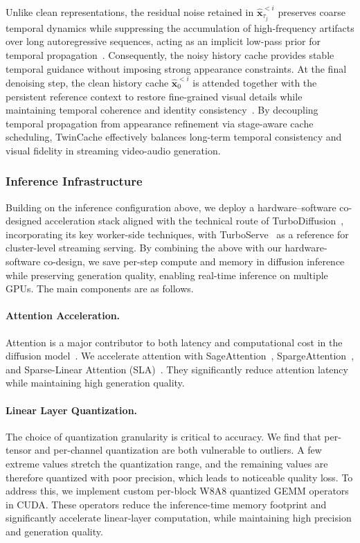 Unlike clean representations, the residual noise retained in $\hat{\bm{x}}_{\tau_j}^{<i}$ preserves coarse temporal dynamics while suppressing the accumulation of high-frequency artifacts over long autoregressive sequences, acting as an implicit low-pass prior for temporal propagation~\cite{huang2025live,zheng2026causal}. Consequently, the noisy history cache provides stable temporal guidance without imposing strong appearance constraints. At the final denoising step, the clean history cache $\hat{\bm{x}}_{0}^{<i}$ is attended together with the persistent reference context to restore fine-grained visual details while maintaining temporal coherence and identity consistency~\cite{zeng2026lpm}. By decoupling temporal propagation from appearance refinement via stage-aware cache scheduling, TwinCache effectively balances long-term temporal consistency and visual fidelity in streaming video-audio generation.


\subsubsection{Inference Infrastructure}

Building on the inference configuration above, we deploy a hardware--software co-designed acceleration stack aligned with the technical route of TurboDiffusion~\cite{zhang2025turbodiffusion}, incorporating its key worker-side techniques, with TurboServe~\cite{jiang2026turboserve} as a reference for cluster-level streaming serving. By combining the above with our hardware-software co-design, we save per-step compute and memory in diffusion inference while preserving generation quality, enabling real-time inference on multiple GPUs. The main components are as follows.

\paragraph{Attention Acceleration.}
Attention is a major contributor to both latency and computational cost in the diffusion model~\cite{zhangefficient}. We accelerate attention with SageAttention~\cite{zhang2025sageattention,zhang2024sageattention2,zhang2025sageattention2++,zhang2025sageattention3,zhang2026sagebwd}, SpargeAttention~\cite{zhang2025spargeattention,zhang2026spargeattention2}, and Sparse-Linear Attention (SLA)~\cite{zhang2025sla,zhang2026sla2}. They significantly reduce attention latency while maintaining high generation quality.

\paragraph{Linear Layer Quantization.}
The choice of quantization granularity is critical to accuracy. We find that per-tensor and per-channel quantization are both vulnerable to outliers. A few extreme values stretch the quantization range, and the remaining values are therefore quantized with poor precision, which leads to noticeable quality loss. To address this, we implement custom per-block W8A8 quantized GEMM operators in CUDA. These operators reduce the inference-time memory footprint and significantly accelerate linear-layer computation, while maintaining high precision and generation quality.

